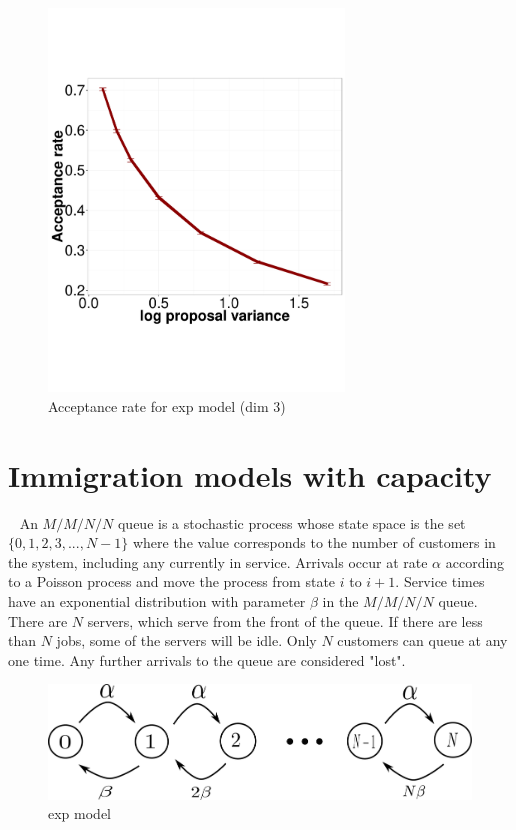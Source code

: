   \begin{figure}%
  \centering
  \begin{minipage}[hp]{0.45\linewidth}
  \centering
    \includegraphics [width=0.70\textwidth, angle=0]{figs/acc_rate_exp_d3.pdf}
    \caption{Acceptance rate for exp model (dim 3)}
      \end{minipage}
  \end{figure}


\section{Immigration models with capacity}~
An $M/M/N/N$ queue is a stochastic process whose state space is the set $\{0, 1, 2, 3, ..., N - 1\}$ where the value corresponds to the number of customers in the system, including any currently in service. Arrivals occur at rate $\alpha$ according to a Poisson process and move the process from state $i$ to $i+1$. Service times have an exponential distribution with parameter $\beta$ in the $M/M/N/N$ queue. There are $N$ servers, which serve from the front of the queue. If there are less than $N$ jobs, some of the servers will be idle. Only $N$ customers can queue at any one time. Any further arrivals to the queue are considered "lost". 
  \begin{figure}[H]
  \centering
  \begin{minipage}[!hp]{0.6\linewidth}%
  \centering
    \includegraphics [width=1\textwidth, angle=0]{figs/queue_model.pdf}%
      \end{minipage}
    \caption{exp model}
  \end{figure}


